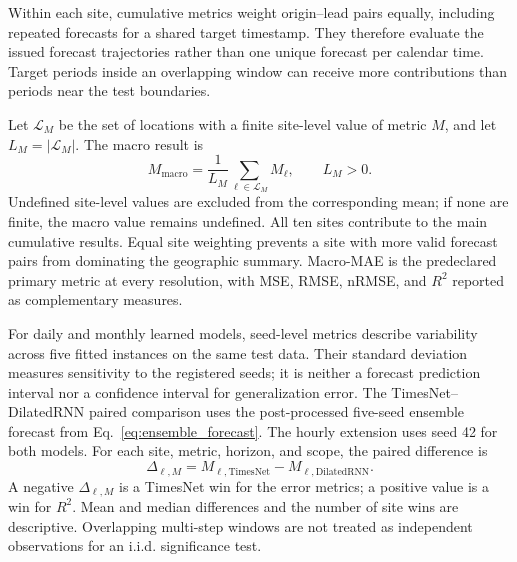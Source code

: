 Within each site, cumulative metrics weight origin--lead pairs equally,
including repeated forecasts for a shared target timestamp. They therefore
evaluate the issued forecast trajectories rather than one unique forecast
per calendar time. Target periods inside an overlapping window can receive
more contributions than periods near the test boundaries.

Let $\mathcal{L}_{M}$ be the set of locations with a finite site-level value
of metric $M$, and let $L_M=|\mathcal{L}_{M}|$. The macro result is
\begin{equation}
 M_{\mathrm{macro}}
 =
 \frac{1}{L_M}\sum_{\ell\in\mathcal{L}_{M}}M_{\ell},
 \qquad L_M>0.
 \label{eq:macro_metric}
\end{equation}
Undefined site-level values are excluded from the corresponding mean; if
none are finite, the macro value remains undefined. All ten sites contribute
to the main cumulative results. Equal site weighting prevents a site with more
valid forecast pairs from dominating the geographic summary.
Macro-MAE is the predeclared primary metric at every resolution, with
MSE, RMSE, nRMSE, and $R^2$ reported as complementary measures.

For daily and monthly learned models, seed-level metrics describe variability
across five fitted instances on the same test data. Their standard deviation
measures sensitivity to the registered seeds; it is neither a forecast
prediction interval nor a confidence interval for generalization error.
The TimesNet--DilatedRNN paired comparison uses the post-processed five-seed
ensemble forecast from Eq.~\eqref{eq:ensemble_forecast}. The hourly extension
uses seed 42 for both models. For each site, metric, horizon, and scope,
the paired difference is
\begin{equation}
 \Delta_{\ell,M}
 =
 M_{\ell,\mathrm{TimesNet}}-M_{\ell,\mathrm{DilatedRNN}}.
 \label{eq:paired_difference}
\end{equation}
A negative $\Delta_{\ell,M}$ is a TimesNet win for the error metrics; a
positive value is a win for $R^2$. Mean and median differences and the number
of site wins are descriptive. Overlapping multi-step windows are not treated
as independent observations for an i.i.d. significance test.

